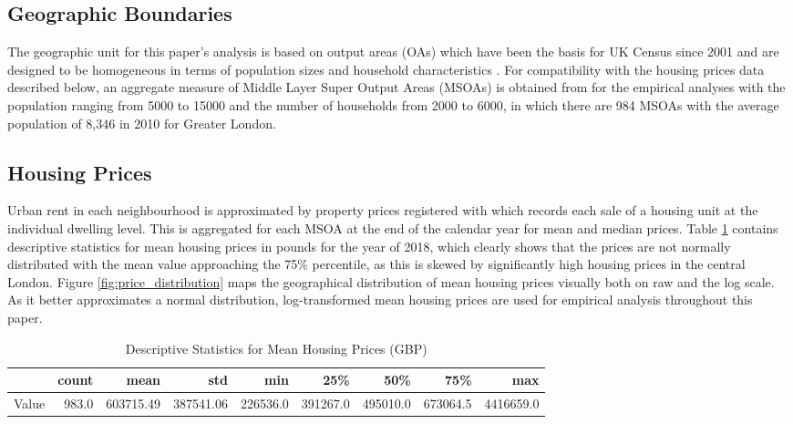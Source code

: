 \documentclass{article}
\begin{document}
\subsection{Geographic Boundaries} \label{subsection:boundaries}
The geographic unit for this paper's analysis is based on output areas (OAs) which have been the basis for UK Census since 2001 and are designed to be homogeneous in terms of population sizes and household characteristics \citep{OfficeforNationalStatistics2019CensusGeography}. For compatibility with the housing prices data described below, an aggregate measure of Middle Layer Super Output Areas (MSOAs) is obtained from \citet{LondonDatastore2015LSOAAtlas} for the empirical analyses with the population ranging from 5000 to 15000 and the number of households from 2000 to 6000, in which there are 984 MSOAs with the average population of 8,346 in 2010 for Greater London.

\subsection{Housing Prices}
Urban rent in each neighbourhood is approximated by property prices registered with \citet{LandRegistry2019AverageLSOA} which records each sale of a housing unit at the individual dwelling level. This is aggregated for each MSOA at the end of the calendar year for mean and median prices. Table \ref{table:housing} contains descriptive statistics for mean housing prices in pounds for the year of 2018, which clearly shows that the prices are not normally distributed with the mean value approaching the 75\% percentile, as this is skewed by significantly high housing prices in the central London. Figure \ref{fig:price_distribution} maps the geographical distribution of mean housing prices visually both on raw and the log scale. As it better approximates a normal distribution, log-transformed mean housing prices are used for empirical analysis throughout this paper.

\begin{table}[t]
\caption{Descriptive Statistics for Mean Housing Prices (GBP)} 
  \label{table:housing} 
\begin{tabular}{lrrrrrrrr}
\toprule
{} &  count &       mean &        std &       min &       25\% &       50\% &       75\% &        max \\
\midrule
Value &  983.0 &  603715.49 &  387541.06 &  226536.0 &  391267.0 &  495010.0 &  673064.5 &  4416659.0 \\
\bottomrule
\end{tabular}
\end{table}
\end{document}
